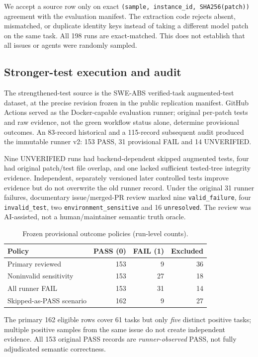\documentclass[journal]{IEEEtran}
\begin{document}
We accept a source row only on exact \texttt{(sample, instance\_id, SHA256(patch))} agreement with the evaluation manifest. The extraction code rejects absent, mismatched, or duplicate identity keys instead of taking a different model patch on the same task. All 198 runs are exact-matched. This does not establish that all issues or agents were randomly sampled.

\subsection{Stronger-test execution and audit}
The strengthened-test source is the SWE-ABS verified-task augmented-test dataset, at the precise revision frozen in the public replication manifest. GitHub Actions served as the Docker-capable evaluation runner; original per-patch tests and raw evidence, not the green workflow status alone, determine provisional outcomes. An 83-record historical and a 115-record subsequent audit produced the immutable runner v2: 153 PASS, 31 provisional FAIL and 14 UNVERIFIED.

Nine UNVERIFIED runs had backend-dependent skipped augmented tests, four had original patch/test file overlap, and one lacked sufficient tested-tree integrity evidence. Independent, separately versioned later controlled tests improve evidence but do not overwrite the old runner record. Under the original 31 runner failures, documentary issue/merged-PR review marked nine \texttt{valid\_failure}, four \texttt{invalid\_test}, two \texttt{environment\_sensitive} and 16 \texttt{unresolved}. The review was AI-assisted, not a human/maintainer semantic truth oracle.

\begin{table}[t]
\centering
\caption{Frozen provisional outcome policies (run-level counts).}
\label{tab:labels}
\begin{tabular}{lrrr}
\toprule
Policy & PASS (0) & FAIL (1) & Excluded\\
\midrule
Primary reviewed &153&9&36\\
Noninvalid sensitivity &153&27&18\\
All runner FAIL &153&31&14\\
Skipped-as-PASS scenario &162&9&27\\
\bottomrule
\end{tabular}
\end{table}

The primary 162 eligible rows cover 61 tasks but only \emph{five} distinct positive tasks; multiple positive samples from the same issue do not create independent evidence. All 153 original PASS records are \emph{runner-observed} PASS, not fully adjudicated semantic correctness.
\end{document}
